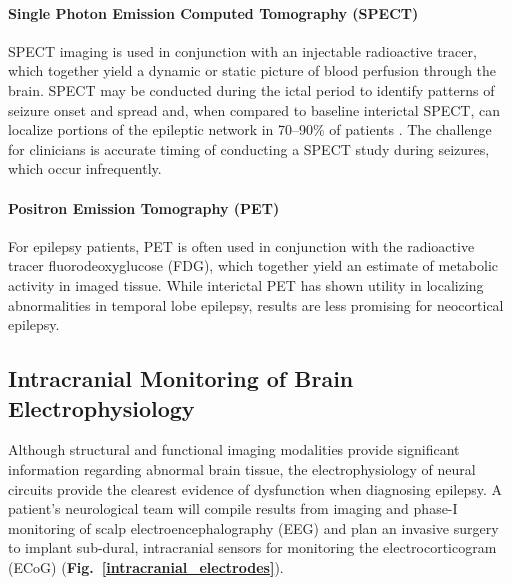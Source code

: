 \paragraph{Single Photon Emission Computed Tomography (SPECT)}
SPECT imaging is used in conjunction with an injectable radioactive tracer, which together yield a dynamic or static picture of blood perfusion through the brain. SPECT may be conducted during the ictal period to identify patterns of seizure onset and spread and, when compared to baseline interictal SPECT, can localize portions of the epileptic network in 70--90\% of patients \cite{kuzniecky2002neuroimaging}. The challenge for clinicians is accurate timing of conducting a SPECT study during seizures, which occur infrequently.

\paragraph{Positron Emission Tomography (PET)}
For epilepsy patients, PET is often used in conjunction with the radioactive tracer fluorodeoxyglucose (FDG), which together yield an estimate of metabolic activity in imaged tissue. While interictal PET has shown utility in localizing abnormalities in temporal lobe epilepsy, results are less promising for neocortical epilepsy. 

\subsection{Intracranial Monitoring of Brain Electrophysiology}
\label{subsec:ephys}
Although structural and functional imaging modalities provide significant information regarding abnormal brain tissue, the electrophysiology of neural circuits provide the clearest evidence of dysfunction when diagnosing epilepsy. A patient's neurological team will compile results from imaging and phase-I monitoring of scalp electroencephalography (EEG) and plan an invasive surgery to implant sub-dural, intracranial sensors for monitoring the electrocorticogram (ECoG) (\textbf{Fig.~\ref{intracranial_electrodes}}).  

